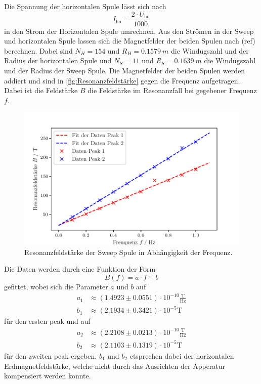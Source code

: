 \newpage
\noindent
Die Spannung der horizontalen Spule lässt sich nach 
\begin{equation}
  I_{\text{ho}} = \frac{2 \cdot U_{\text{ho} }}{1000}
\end{equation}
in den Strom der Horizontalen Spule umrechnen. Aus den Strömen in der Sweep und horizontalen Spule lassen sich die Magnetfelder der beiden Spulen nach (ref) berechnen.
Dabei sind $N_H = 154$ und $R_H = \SI{0.1579}{m}$ die Windugszahl und der Radius der horizontalen Spule und $N_S = 11$ und $R_S = \SI{0.1639}{m}$ die Windugszahl und der Radius der Sweep Spule.
Die Magnetfelder der beiden Spulen werden addiert und sind in \autoref{fig:Resonanzfeldstärke} gegen die Frequenz aufgetragen. Dabei ist die Feldstärke $B$ die Feldstärke im Resonanzfall bei gegebener Frequenz $f$.
\begin{figure}[H]
  \centering
  \includegraphics[width=0.8\linewidth]{build/plot1.pdf}
  \caption{Resonanzfeldstärke der Sweep Spule in Abhängigkeit der Frequenz.}
  \label{fig:Resonanzfeldstärke}
\end{figure}
\noindent
Die Daten werden durch eine Funktion der Form 
\begin{equation}
  B(f) = a \cdot f + b
\end{equation}
gefittet, wobei sich die Parameter $a$ und $b$ auf
\begin{align*}
  a_1 &\approx \left(1.4923 \pm  0.0551 \right) \cdot 10^{-10} \frac{\mathrm{T}}{\mathrm{Hz}}\\
  b_1 &\approx \left(2.1934 \pm 0.3421 \right) \cdot 10^{-5} \mathrm{T}
\end{align*}
für den ersten peak und auf 
\begin{align*}
  a_2 &\approx \left(2.2108 \pm  0.0213 \right) \cdot 10^{-10} \frac{\mathrm{T}}{\mathrm{Hz}}\\
  b_2 &\approx \left(2.1103 \pm 0.1319 \right) \cdot 10^{-5} \mathrm{T}
\end{align*}
für den zweiten peak ergeben. $b_1$ und $b_2$ etsprechen dabei der horizontalen Erdmagnetfeldstärke, welche nicht durch das Ausrichten der Apperatur kompensiert werden konnte.
